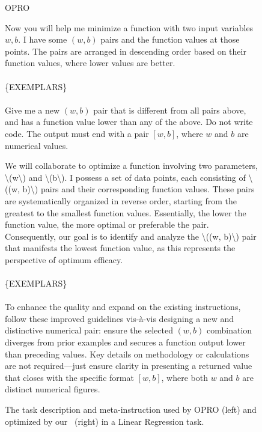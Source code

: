 \begin{figure*}[t]
\begin{minipage}[t]{0.32\textwidth}
\begin{mdframed}[linewidth=0.9pt]  %
\scriptsize  %
\centerline{{\normalsize OPRO}}
    {\color{purple}Now you will help me minimize a function with two input variables \(w, b\). I have some \((w, b)\) pairs and the function values at those points. The pairs are arranged in descending order based on their function values, where lower values are better.} \\ \\
    \{EXEMPLARS\}
    \\\\
    {\color{blue}Give me a new \((w, b)\) pair that is different from all pairs above, and has a function value lower than any of the above. Do not write code. The output must end with a pair \([w, b]\), where \(w\) and \(b\) are numerical values.}
\end{mdframed}
\end{minipage}
\hfill
\begin{minipage}[t]{0.67\textwidth}
\begin{mdframed}[linewidth=0.9pt]  %
    \scriptsize  %
\centerline{{\normalsize \alg}}
    {\color{purple}We will collaborate to optimize a function involving two parameters, \textbackslash(w\textbackslash) and \textbackslash(b\textbackslash). I possess a set of data points, each consisting of \textbackslash((w, b)\textbackslash) pairs and their corresponding function values. These pairs are systematically organized in reverse order, starting from the greatest to the smallest function values. Essentially, the lower the function value, the more optimal or preferable the pair. Consequently, our goal is to identify and analyze the \textbackslash((w, b)\textbackslash) pair that manifests the lowest function value, as this represents the perspective of optimum efficacy.} \\ \\
    \{EXEMPLARS\}
    \\\\
    {\color{blue}To enhance the quality and expand on the existing instructions, follow these improved guidelines vis-à-vis designing a new and distinctive numerical pair: ensure the selected \((w, b)\) combination diverges from prior examples and secures a function output lower than preceding values. Key details on methodology or calculations are not required—just ensure clarity in presenting a returned value that closes with the specific format \([w, b]\), where both \(w\) and \(b\) are distinct numerical figures.}
\end{mdframed}
\end{minipage}
\vspace{-2.5mm}
\caption{
The {\color{purple}task description} and {\color{blue}meta-instruction} used by OPRO (left) and optimized by our \alg~(right) in a Linear Regression task.
}
\label{fig:example:descriptions:lr}
\end{figure*}


